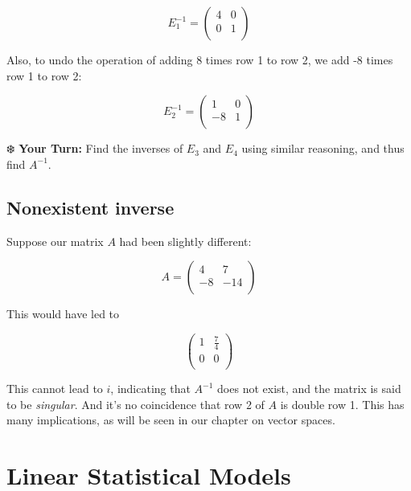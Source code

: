 \documentclass[
  letterpaper,
  DIV=11,
  numbers=noendperiod,
  oneside]{scrreprt}
\begin{document}
\[
E_1^{-1} =
 \left (
 \begin{array}{rr}
 4 & 0 \\
 0 & 1  \\
 \end{array}
 \right )
\]

Also, to undo the operation of adding 8 times row 1 to row 2, we add -8
times row 1 to row 2:

\[
E_2^{-1} =
 \left (
 \begin{array}{rr}
 1 & 0 \\
 -8 & 1 \\
 \end{array}
 \right )
\]

❄️ \textbf{Your Turn:} Find the inverses of \(E_3\) and \(E_4\) using
similar reasoning, and thus find \(A^{-1}\).

\hypertarget{nonexistent-inverse}{%
\section{Nonexistent inverse}\label{nonexistent-inverse}}

Suppose our matrix \(A\) had been slightly different:

\[
 A =
 \left (
 \begin{array}{rr}
 4 & 7 \\
 -8 & -14  \\
 \end{array}
 \right )
 \]

This would have led to

\[
 \left (
 \begin{array}{rr}
 1 & \frac{7}{4} \\
 0 & 0  \\
 \end{array}
 \right )
 \]

This cannot lead to \(i\), indicating that \(A^{-1}\) does not exist,
and the matrix is said to be \emph{singular}. And it's no coincidence
that row 2 of \(A\) is double row 1. This has many implications, as will
be seen in our chapter on vector spaces.


\hypertarget{linear-statistical-models}{%
\chapter{Linear Statistical Models}\label{linear-statistical-models}}

\newpage{}
\end{document}
